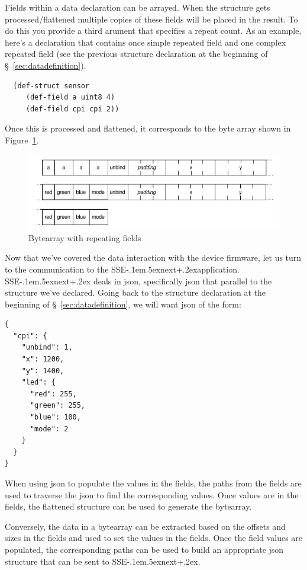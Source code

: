 \documentclass[12pt]{article}
\def\SSEnext{SSE\kern-.1em\lower.5ex\hbox{\footnotesize next}\kern+.2ex}
\begin{document}
Fields within a data declaration can be arrayed. When the structure
gets processed/flattened multiple copies of these fields will be
placed in the result. To do this you provide a third arument that
specifies a repeat count. As an example, here's a declaration that
contains once simple repeated field and one complex repeated field
(see the previous structure declaration at the beginning of \S~\ref{sec:datadefinition}).

\begin{verbatim}
  (def-struct sensor
     (def-field a uint8 4)
     (def-field cpi cpi 2))
\end{verbatim}

Once this is processed and flattened, it corresponds to the byte array
shown in Figure~\ref{fig:repeatingbytearray}.

\begin{figure}[htbp] %
   \centering
   \includegraphics[width=6in]{repeated_bytearray.png} 
\caption{Bytearray with repeating fields}
\label{fig:repeatingbytearray}
\end{figure}

Now that we've covered the data interaction with the device firmware,
let us turn to the communication to the \SSEnext application. \SSEnext
deals in json, specifically json that parallel to the structure we've
declared. Going back to the structure declaration at the beginning of
\S~\ref{sec:datadefinition}, we will want json of the form:

\begin{verbatim}
{
  "cpi": {
    "unbind": 1,
    "x": 1200,
    "y": 1400,
    "led": {
      "red": 255,
      "green": 255,
      "blue": 100,
      "mode": 2
    }
  }
}
\end{verbatim}

When using json to populate the values in the fields, the paths from
the fields are used to traverse the json to find the corresponding
values. Once values are in the fields, the flattened structure can be
used to generate the bytearray. 

Conversely, the data in a bytearray can be extracted based on the
offsets and sizes in the fields and used to set the values in the
fields. Once the field values are populated, the corresponding paths
can be used to build an appropriate json structure that can be sent to
\SSEnext. 
\end{document}
